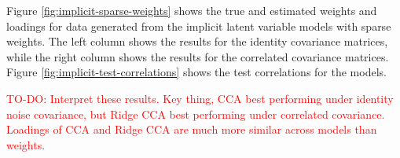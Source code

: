 Figure \ref{fig:implicit-sparse-weights} shows the true and estimated weights and \gls{loadings} for data generated from the implicit latent variable models with sparse weights.
The left column shows the results for the identity covariance matrices, while the right column shows the results for the correlated covariance matrices.
Figure \ref{fig:implicit-test-correlations} shows the test correlations for the models.

\textcolor{red}{TO-DO: Interpret these results. Key thing, CCA best performing under identity noise covariance, but Ridge CCA best performing under correlated covariance. Loadings of CCA and Ridge CCA are much more similar across models than weights.}

\begin{figure}
\centering
\begin{subfigure}{0.49\linewidth}
\centering

\end{subfigure}
\end{figure}
